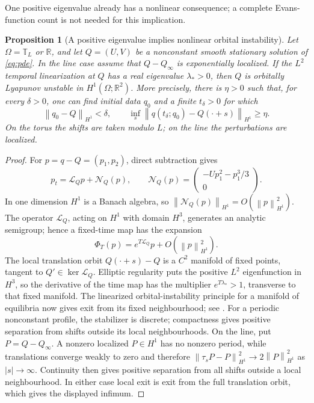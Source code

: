 \documentclass[11pt,reqno]{amsart}
\numberwithin{equation}{section}
\newtheorem{proposition}[theorem]{Proposition}
\theoremstyle{definition}
\theoremstyle{remark}
\newcommand{\norm}[1]{\left\lVert #1\right\rVert}
\begin{document}
One positive eigenvalue already has a nonlinear consequence; a complete
Evans-function count is not needed for this implication.

\begin{proposition}[A positive eigenvalue implies nonlinear orbital instability]
\label{prop:nonlinear-instability}
Let $\Omega=\mathbb T_L$ or $\mathbb R$, and let $Q=(U,V)$ be a nonconstant
smooth stationary solution of \eqref{eq:pde}.  In the line case assume that
$Q-Q_\infty$ is exponentially localized.  If the $L^2$ temporal
linearization at $Q$ has a real eigenvalue $\lambda_*>0$, then $Q$ is
orbitally Lyapunov unstable in $H^1(\Omega;\mathbb R^2)$.  More precisely,
there is $\eta>0$ such that, for every $\delta>0$, one can find initial data
$q_0$ and a finite $t_\delta>0$ for which
\[
 \norm{q_0-Q}_{H^1}<\delta,
 \qquad
 \inf_s\norm{q(t_\delta;q_0)-Q(\cdot+s)}_{H^1}\ge\eta.
\]
On the torus the shifts are taken modulo $L$; on the line the perturbations
are localized.
\end{proposition}

\begin{proof}
For $p=q-Q=(p_1,p_2)$, direct subtraction gives
\[
 p_t=\mathcal L_Qp+\mathcal N_Q(p),\qquad
 \mathcal N_Q(p)=
 \begin{pmatrix}-Up_1^2-p_1^3/3\\0\end{pmatrix}.
\]
In one dimension $H^1$ is a Banach algebra, so
$\norm{\mathcal N_Q(p)}_{H^1}=O(\norm p_{H^1}^2)$.  The operator
$\mathcal L_Q$, acting on $H^1$ with domain $H^3$, generates an analytic
semigroup; hence a fixed-time map has the expansion
\[
 \Phi_T(p)=e^{T\mathcal L_Q}p+O(\norm p_{H^1}^2).
\]
The local translation orbit $Q(\cdot+s)-Q$ is a $C^2$ manifold of fixed
points, tangent to $Q'\in\ker\mathcal L_Q$.  Elliptic regularity puts the
positive $L^2$ eigenfunction in $H^3$, so the derivative of the time map has
the multiplier $e^{T\lambda_*}>1$, transverse to that fixed manifold.  The
linearized orbital-instability principle for a manifold of equilibria now
gives exit from its fixed neighbourhood; see
\cite[Section~5.3]{MeyriesRademacherSiero2014}.  For a periodic nonconstant
profile, the stabilizer is discrete; compactness gives positive separation
from shifts outside its local neighbourhoods.  On the line, put
$P=Q-Q_\infty$.  A nonzero localized $P\in H^1$ has no nonzero period, while
translations converge weakly to zero and therefore
$\norm{\tau_sP-P}_{H^1}^2\to2\norm P_{H^1}^2$ as $|s|\to\infty$.
Continuity then gives positive separation from all shifts outside a local
neighbourhood.  In either case local exit is exit from the full translation
orbit, which gives the displayed infimum.
\end{proof}
\end{document}
